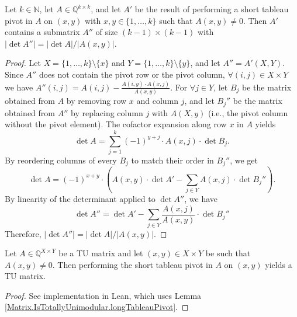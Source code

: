 \begin{lemma}
    \label{shortTableauPivot_submatrix_det_abs_eq_div}
    \leanok
    Let $k \in \mathbb{N}$, let $A \in \mathbb{Q}^{k \times k}$, and let $A'$ be the result of performing a short tableau pivot in $A$ on $(x, y)$ with $x, y \in \{1, \dots, k\}$ such that $A (x, y) \neq 0$. Then $A'$ contains a submatrix $A''$ of size $(k - 1) \times (k - 1)$ with $|\det A''| = |\det A| / |A (x, y)|$.
\end{lemma}

\begin{proof}
    \leanok
    Let $X = \{1, \dots, k\} \setminus \{x\}$ and $Y = \{1, \dots, k\} \setminus \{y\}$, and let $A'' = A' (X, Y)$. Since $A''$ does not contain the pivot row or the pivot column, $\forall (i, j) \in X \times Y$ we have $A'' (i, j) = A (i, j) - \frac{A (i, y) \cdot A (x, j)}{A (x, y)}$. For $\forall j \in Y$, let $B_{j}$ be the matrix obtained from $A$ by removing row $x$ and column $j$, and let $B_{j}''$ be the matrix obtained from $A''$ by replacing column $j$ with $A (X, y)$ (i.e., the pivot column without the pivot element). The cofactor expansion along row $x$ in $A$ yields
    \[
        \det A = \sum_{j = 1}^{k} (-1)^{y + j} \cdot A (x, j) \cdot \det B_{j}.
    \]
    By reordering columns of every $B_{j}$ to match their order in $B_{j}''$, we get
    \[
        \det A = (-1)^{x + y} \cdot \left( A (x, y) \cdot \det A' - \sum_{j \in Y} A (x, j) \cdot \det B_{j}'' \right).
    \]
    By linearity of the determinant applied to $\det A''$, we have
    \[
        \det A'' = \det A' - \sum_{j \in Y} \frac{A (x, j)}{A (x, y)} \cdot \det B_{j}''
    \]
    Therefore, $|\det A''| = |\det A| / |A (x, y)|$.
\end{proof}

\begin{lemma}
    \label{Matrix.IsTotallyUnimodular.shortTableauPivot}
    \leanok
    Let $A \in \mathbb{Q}^{X \times Y}$ be a TU matrix and let $(x, y) \in X \times Y$ be such that $A (x, y) \neq 0$. Then performing the short tableau pivot in $A$ on $(x, y)$ yields a TU matrix.
\end{lemma}

\begin{proof}
    \leanok
    See implementation in Lean, which uses Lemma \ref{Matrix.IsTotallyUnimodular.longTableauPivot}.
\end{proof}



